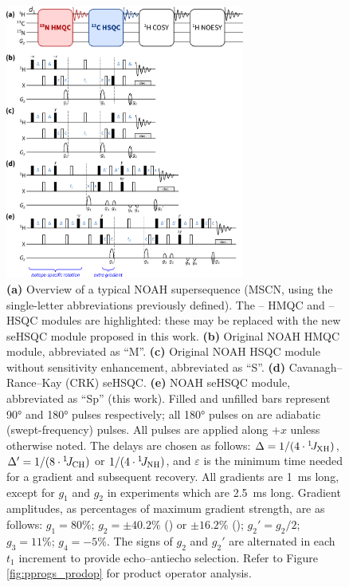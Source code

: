 \documentclass[11pt]{article}
\newcommand*{\carbon}{\ce{^{13}C}}
\newcommand*{\proton}{\ce{^{1}H}}
\newcommand*{\nitrogen}{\ce{^{15}N}}
\newcommand*{\onejxh}{{}^{1}\!J_{\ce{XH}}}
\newcommand*{\onejch}{{}^{1}\!J_{\ce{CH}}}
\newcommand*{\onejnh}{{}^{1}\!J_{\ce{NH}}}
\newcommand*{\figref}[1]{Figure \ref{fig:#1}}
\begin{document}
\begin{figure}
    \centering
    \includegraphics[width=0.7\textwidth]{pprogs.png}
    \caption{
        \textbf{(a)} Overview of a typical NOAH supersequence (MSCN, using the single-letter abbreviations previously defined\autocite{Kupce2017ACIE}).
        The \nitrogen{}--\proton{} HMQC and \carbon{}--\proton{} HSQC modules are highlighted: these may be replaced with the new seHSQC module proposed in this work.
        \textbf{(b)} Original NOAH HMQC module,\autocite{Kupce2017ACIE, Kupce2007MRC} abbreviated as ``M''.
        \textbf{(c)} Original NOAH HSQC module without sensitivity enhancement,\autocite{Kupce2017ACIE, Schulze-Sunninghausen2017JMR} abbreviated as ``S''.
        \textbf{(d)} Cavanagh--Rance--Kay (CRK) seHSQC.\autocite{sehsqc}
        \textbf{(e)} NOAH seHSQC module, abbreviated as ``Sp'' (this work).
        Filled and unfilled bars represent \ang{90} and \ang{180} pulses respectively; all \ang{180} pulses on \carbon{} are adiabatic (swept-frequency) pulses.
        All pulses are applied along $+x$ unless otherwise noted.
        The delays are chosen as follows: $\Delta = 1/(4\cdot\onejxh)$, $\Delta' = 1/(8\cdot\onejch)$ or $1/(4\cdot\onejnh)$, and $\varepsilon$ is the minimum time needed for a gradient and subsequent recovery.
        All gradients are \SI{1}{\ms} long, except for $g_1$ and $g_2$ in \nitrogen{} experiments which are \SI{2.5}{\ms} long.
        Gradient amplitudes, as percentages of maximum gradient strength, are as follows: $g_1 = 80\%$; $g_2 = \pm 40.2\%$ (\carbon{}) or $\pm 16.2\%$ (\nitrogen{}); ${g_2}' = g_2/2$; $g_3 = 11\%$; $g_4 = -5\%$.
        The signs of $g_2$ and ${g_2}'$ are alternated in each $t_1$ increment to provide echo--antiecho selection.
        Refer to \figref{pprogs_prodop} for product operator analysis.
    }
    \label{fig:pprogs}
\end{figure}
\end{document}
